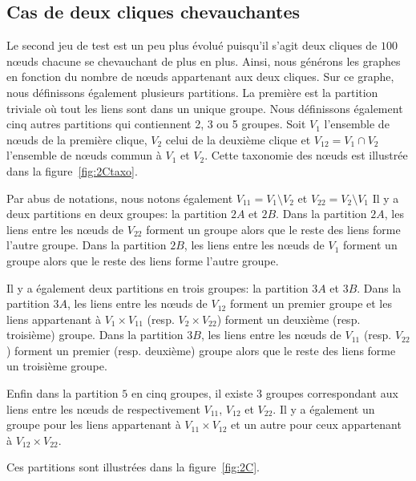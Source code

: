 \subsection{Cas de deux cliques chevauchantes}
\label{subsec:2cliques}

Le second jeu de test est un peu plus évolué puisqu'il s'agit deux cliques de $100$ n\oe{}uds chacune se chevauchant de plus en plus.
Ainsi, nous générons les graphes en fonction du nombre de n\oe{}uds appartenant aux deux cliques.
Sur ce graphe, nous définissons également plusieurs partitions.
La première est la partition triviale où tout les liens sont dans un unique groupe.
Nous définissons également cinq autres partitions qui contiennent 2, 3 ou 5 groupes.
Soit $V_1$ l'ensemble de n\oe{}uds de la première clique, $V_2$ celui de la deuxième clique et $V_{12}=V_1 \cap V_2$ l'ensemble de n\oe{}uds commun à $V_1$ et $V_2$.
Cette taxonomie des n\oe{}uds est illustrée dans la figure~\ref{fig:2Ctaxo}.

Par abus de notations, nous notons également $V_{11}=V_1\setminus V_2$ et  $V_{22}=V_2\setminus V_1$
Il y a deux partitions en deux groupes: la partition $2A$ et $2B$.
Dans la partition $2A$, les liens entre les n\oe{}uds de $V_{22}$ forment un groupe alors que le reste des liens forme l'autre groupe.
Dans la partition $2B$, les liens entre les n\oe{}uds de $V_{1}$ forment un groupe alors que le reste des liens forme l'autre groupe.

Il y a également deux partitions en trois groupes: la partition $3A$ et $3B$.
Dans la partition $3A$, les liens entre les n\oe{}uds de $V_{12}$ forment un premier groupe et les liens appartenant à $V_1\times V_{11}$ (resp. $V_2\times V_{22}$) forment un deuxième (resp. troisième) groupe.
Dans la partition $3B$, les liens entre les n\oe{}uds de $V_{11}$ (resp. $V_{22}$) forment un premier (resp. deuxième) groupe alors que le reste des liens forme un troisième groupe.

Enfin dans la partition $5$ en cinq groupes, il existe 3 groupes correspondant aux liens entre les n\oe{}uds de respectivement $V_{11}$, $V_{12}$ et $V_{22}$.
Il y a également un groupe pour les liens appartenant à $V_{11} \times V_{12}$ et un autre pour ceux appartenant à $V_{12} \times V_{22}$.

Ces partitions sont illustrées dans la figure~\ref{fig:2C}.

